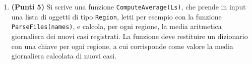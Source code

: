 \begin{enumerate}
Nella funzione di test, si chiede di leggere cinque file, dello stesso tipo del file {\tt .csv} descritto sopra,
ma che si riferiscono a date diverse.

\item {\bf (Punti 5)} Si scrive una funzione {\tt ComputeAverage(Ls)}, che prende in input una lista di oggetti di tipo {\tt Region},
letti per esempio con la funzione {\tt ParseFiles(names)}, e calcola, per ogni regione, la media aritmetica giornaliera dei nuovi casi registrati.
La funzione deve restituire un dizionario con una chiave per ogni regione, a cui corrisponde come valore la media giornaliera calcolata di nuovi casi.


\end{enumerate}


%

